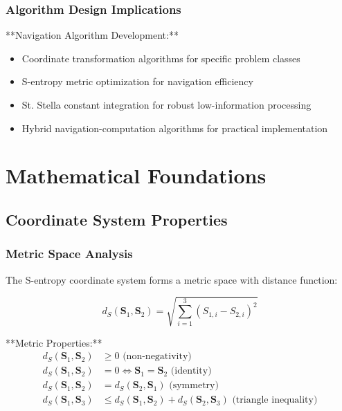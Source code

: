 \documentclass[11pt]{article}
\begin{document}
\subsubsection{Algorithm Design Implications}

**Navigation Algorithm Development:**
\begin{itemize}
\item Coordinate transformation algorithms for specific problem classes
\item S-entropy metric optimization for navigation efficiency
\item St. Stella constant integration for robust low-information processing
\item Hybrid navigation-computation algorithms for practical implementation
\end{itemize}

\section{Mathematical Foundations}

\subsection{Coordinate System Properties}

\subsubsection{Metric Space Analysis}

The S-entropy coordinate system forms a metric space with distance function:

\begin{equation}
d_S(\mathbf{S}_1, \mathbf{S}_2) = \sqrt{\sum_{i=1}^{3} (S_{1,i} - S_{2,i})^2}
\label{eq:s_entropy_metric}
\end{equation}

**Metric Properties:**
\begin{align}
d_S(\mathbf{S}_1, \mathbf{S}_2) &\geq 0 \text{ (non-negativity)} \\
d_S(\mathbf{S}_1, \mathbf{S}_2) &= 0 \iff \mathbf{S}_1 = \mathbf{S}_2 \text{ (identity)} \\
d_S(\mathbf{S}_1, \mathbf{S}_2) &= d_S(\mathbf{S}_2, \mathbf{S}_1) \text{ (symmetry)} \\
d_S(\mathbf{S}_1, \mathbf{S}_3) &\leq d_S(\mathbf{S}_1, \mathbf{S}_2) + d_S(\mathbf{S}_2, \mathbf{S}_3) \text{ (triangle inequality)}
\end{align}
\end{document}
